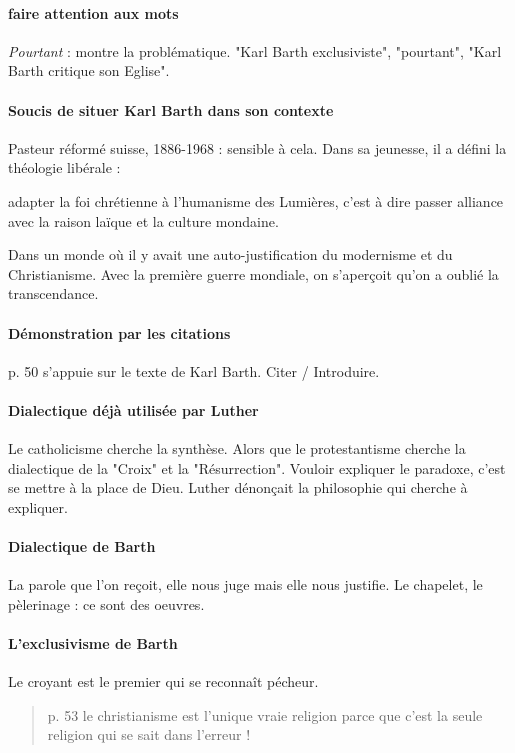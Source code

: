 \paragraph{faire attention aux mots} \textit{Pourtant} : montre la problématique. "Karl Barth exclusiviste", "pourtant", "Karl Barth critique son Eglise". 

\paragraph{Soucis de situer Karl Barth dans son contexte} Pasteur réformé suisse, 1886-1968 : sensible à cela. Dans sa jeunesse, il a défini la théologie libérale : 

\begin{Def}
adapter la foi chrétienne à l'humanisme des Lumières, c'est à dire passer alliance avec la raison laïque et la culture mondaine.
\end{Def}
Dans un monde où il y avait une auto-justification du modernisme et du Christianisme. Avec la première guerre mondiale, on s'aperçoit qu'on a oublié la transcendance. 


\paragraph{Démonstration par les citations} p. 50 s'appuie sur le texte de Karl Barth. Citer / Introduire. 

\paragraph{Dialectique déjà utilisée par Luther} Le catholicisme cherche la synthèse. Alors que le protestantisme cherche la dialectique de la "Croix" et la "Résurrection". Vouloir expliquer le paradoxe, c'est se mettre à la place de Dieu. Luther dénonçait la philosophie qui cherche à expliquer. 

\paragraph{Dialectique de Barth}
La parole que l'on reçoit, elle nous juge mais elle nous justifie.
Le chapelet, le pèlerinage : ce sont des oeuvres. 

\paragraph{L'exclusivisme de Barth} Le croyant est le premier qui se reconnaît pécheur. 
\begin{quote}
    p. 53 le christianisme est l'unique vraie religion parce que c'est la seule religion qui se sait dans l'erreur !
\end{quote}

